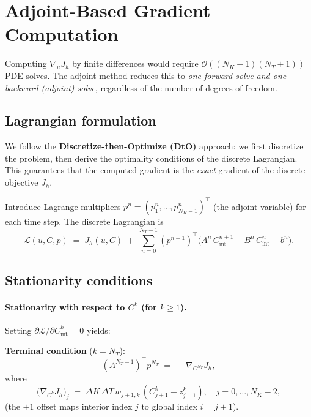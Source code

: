 \documentclass[11pt, a4paper]{article}
\newcommand{\dK}{\Delta K}
\newcommand{\dT}{\Delta T}
\theoremstyle{definition}
\theoremstyle{plain}
\begin{document}
\section{Adjoint-Based Gradient Computation}

Computing $\nabla_u J_h$ by finite differences would require $\mathcal{O}((N_K+1)(N_T+1))$ PDE solves. The adjoint method reduces this to \emph{one forward solve and one backward (adjoint) solve}, regardless of the number of degrees of freedom.

\subsection{Lagrangian formulation}

We follow the \textbf{Discretize-then-Optimize (DtO)} approach: we
first discretize the problem, then derive the optimality conditions of the
discrete Lagrangian. This guarantees that the computed gradient is the
\emph{exact} gradient of the discrete objective $J_h$.

Introduce Lagrange multipliers $p^n = (p_1^n, \ldots, p_{N_K-1}^n)^\top$
(the adjoint variable) for each time step. The discrete Lagrangian is
\begin{equation}\label{eq:Lagrangian}
  \mathcal{L}(u, C, p)
  \;=\; J_h(u, C)
  \;+\; \sum_{n=0}^{N_T-1}
    (p^{n+1})^\top
    \bigl(A^n\,C_\text{int}^{n+1} - B^n\,C_\text{int}^n - b^n\bigr).
\end{equation}

\subsection{Stationarity conditions}

\paragraph{Stationarity with respect to $C^k$ (for $k \geq 1$).}
Setting $\partial \mathcal{L} / \partial C_\text{int}^k = 0$ yields:

\medskip
\textbf{Terminal condition} ($k = N_T$):
\begin{equation}\label{eq:adj_terminal}
  (A^{N_T-1})^\top p^{N_T}
  \;=\; -\nabla_{C^{N_T}} J_h,
\end{equation}
where
\begin{equation}\label{eq:dJdC}
  \bigl(\nabla_{C^k} J_h\bigr)_j
  \;=\; \dK\,\dT\,w_{j+1,k}\,(C_{j+1}^k - z_{j+1}^k),
  \quad j = 0, \ldots, N_K-2,
\end{equation}
(the $+1$ offset maps interior index $j$ to global index $i = j+1$).
\end{document}
